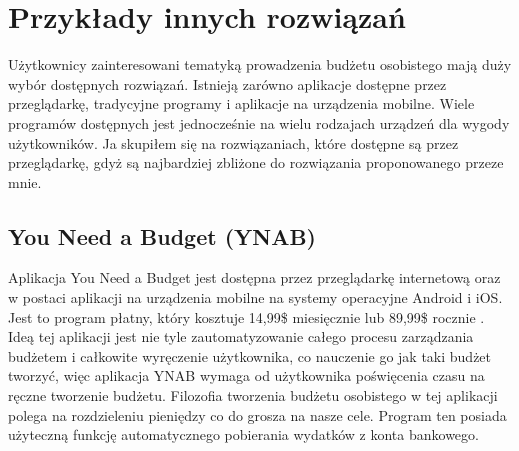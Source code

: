 \documentclass[shortabstract,inz]{iithesis}
\begin{document}
\section{Przykłady innych rozwiązań}
Użytkownicy zainteresowani tematyką prowadzenia budżetu osobistego mają duży wybór dostępnych rozwiązań. Istnieją zarówno aplikacje dostępne przez przeglądarkę, tradycyjne programy i aplikacje na urządzenia mobilne. Wiele programów dostępnych jest jednocześnie na wielu rodzajach urządzeń dla wygody użytkowników. Ja skupiłem się na rozwiązaniach, które dostępne są przez przeglądarkę, gdyż są najbardziej zbliżone do rozwiązania proponowanego przeze mnie.
\subsection{You Need a Budget (YNAB)}
Aplikacja You Need a Budget \citep{ynab} jest dostępna przez przeglądarkę internetową oraz w postaci aplikacji na urządzenia mobilne na systemy operacyjne Android i iOS. Jest to program płatny, który kosztuje 14,99\$ miesięcznie lub 89,99\$ rocznie \cite{ynab-price}. Ideą tej aplikacji jest nie tyle zautomatyzowanie całego procesu zarządzania budżetem i całkowite wyręczenie użytkownika, co nauczenie go jak taki budżet tworzyć, więc aplikacja YNAB wymaga od użytkownika poświęcenia czasu na ręczne tworzenie budżetu. Filozofia tworzenia budżetu osobistego w tej aplikacji polega na rozdzieleniu pieniędzy co do grosza na nasze cele. Program ten posiada użyteczną funkcję automatycznego pobierania wydatków z konta bankowego.
\end{document}
